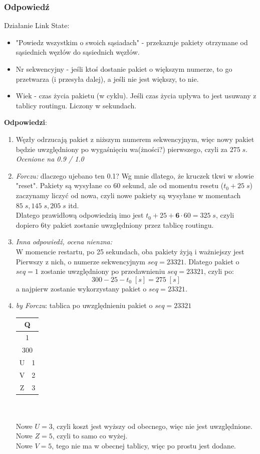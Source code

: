 		\subsubsection{Odpowiedź}
			Działanie Link State:
			\begin{itemize}
				\item "Powiedz wszystkim o swoich sąsiadach" - przekazuje pakiety otrzymane od sąsiednich węzłów do sąsiednich węzłów.
				\item Nr sekwencyjny - jeśli ktoś dostanie pakiet o większym numerze, to go przetwarza (i przesyła dalej), a jeśli nie jest większy, to nie.
				\item Wiek - czas życia pakietu (w cyklu). Jeśli czas życia upływa to jest usuwany z tablicy routingu. Liczony w sekundach.
			\end{itemize}
\newpage
			\textbf{Odpowiedzi}:
			\begin{enumerate}
				\item Węzły odrzucają pakiet z niższym numerem sekwencyjnym, więc nowy pakiet będzie uwzględniony po wygaśnięciu wa(żności?) pierwszego, czyli za $ 275\;s $.\\
				\small{ \emph{Ocenione na 0.9 / 1.0}}
				\item \small{ \emph{Forczu:}} dlaczego ujebano ten 0.1? Wg mnie dlatego, że kruczek tkwi w słowie "reset". Pakiety są wysyłane co 60 sekund, ale od momentu resetu ($ t_0+25\;s $) zaczynamy liczyć od nowa, czyli nowe pakiety są wysyłane w momentach $ 85\;s, 145\;s, 205\;s $ itd.\\
				Dlatego prawidłową odpowiedzią imo jest $ t_0+25+\textbf{6}\cdot{60}=325\;s $, czyli dopiero 6ty pakiet zostanie uwzględniony przez tablicę routingu.
				\item \small{ \emph{Inna odpowiedź, ocena nienzna:}}\\
				W momencie restartu, po 25 sekundach, oba pakiety żyją i ważniejszy jest Pierwszy z nich, o numerze sekwencyjnym $ seq=23321 $. Dlatego pakiet o $ seq=1 $ zostanie uwzględniony po przedawnieniu $ seq=23321 $, czyli po:
				$$ 300 - 25 - t_0\;[s]= 275\;[s] $$
				a najpierw zostanie wykorzystany pakiet o $ seq=23321 $.
				\item \emph{by Forczu}: tablica po uwzględnieniu pakiet o $ seq=23321 $ \\
					\begin{tabular}{|c|c|}
						\hline \multicolumn{2}{|c|}{Q}  \\ 
						\hline \multicolumn{2}{|c|}{1}  \\ 
						\hline \multicolumn{2}{|c|}{300}  \\ 
						\hline U & 1 \\
						\hline V & 2 \\
						\hline Z & 3 \\ 
						\hline 
					\end{tabular}\\\\
				Nowe $ U=3 $, czyli koszt jest wyższy od obecnego, więc nie jest uwzględnione.\\
				Nowe $ Z=5 $, czyli to samo co wyżej.\\
				Nowe $ V=5 $, tego nie ma w obecnej tablicy, więc po prostu jest dodane.
		\end{enumerate}

